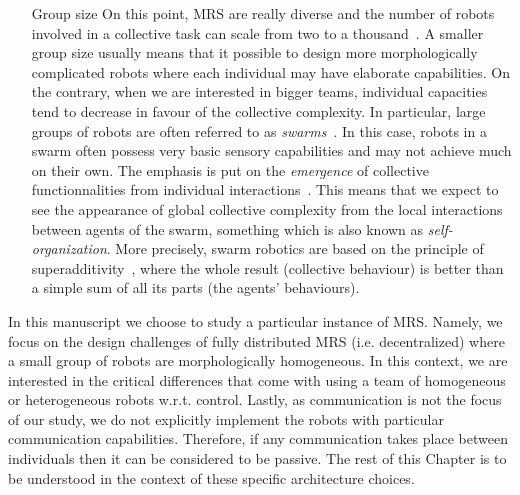 \begin{itemize}
      \item [Group size] {On this point, MRS are really diverse and the number of robots involved in a collective task can scale from two to a thousand~\parencite{Rubenstein2014}. A smaller group size usually means that it possible to design more morphologically complicated robots where each individual may have elaborate capabilities. On the contrary, when we are interested in bigger teams, individual capacities tend to decrease in favour of the collective complexity. In particular, large groups of robots are often referred to as \emph{swarms}~\parencite{Beni2005}. In this case, robots in a swarm often possess very basic sensory capabilities and may not achieve much on their own. The emphasis is put on the \emph{emergence} of collective functionnalities from individual interactions~\parencite{Kube1993, Parker2008}. This means that we expect to see the appearance of global collective complexity from the local interactions between agents of the swarm, something which is also known as \emph{self-organization}. More precisely, swarm robotics are based on the principle of superadditivity~\parencite{Parker2008}, where the whole result (collective behaviour) is better than a simple sum of all its parts (the agents' behaviours).}
    \end{itemize}

    In this manuscript we choose to study a particular instance of MRS. Namely, we focus on the design challenges of fully distributed MRS (i.e. decentralized) where a small group of robots are morphologically homogeneous. In this context, we are interested in the critical differences that come with using a team of homogeneous or heterogeneous robots w.r.t. control. Lastly, as communication is not the focus of our study, we do not explicitly implement the robots with particular communication capabilities. Therefore, if any communication takes place between individuals then it can be considered to be passive. The rest of this Chapter is to be understood in the context of these specific architecture choices.





